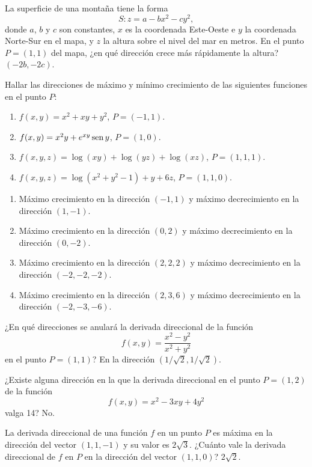 {La superficie de una montaña tiene la forma
\[
S:z=a-bx^2-cy^2,
\]
donde $a$, $b$ y $c$ son constantes, $x$ es la coordenada Este-Oeste e $y$ la coordenada Norte-Sur en el mapa, y $z$ la altura sobre el nivel del mar en metros. 
En el punto $P=(1,1)$ del mapa, ¿en qué dirección crece más rápidamente la altura?
}
{$(-2b,-2c)$.
}
{
}


{Hallar las direcciones de máximo y mínimo crecimiento de las siguientes funciones en el punto $P$:
\begin{enumerate}
\item $f(x,y)=x^2+xy+y^2$, $P=(-1,1)$.
\item $f(x,y)=x^2y+e^{xy}\operatorname{sen} y$, $P=(1,0)$.
\item $f(x,y,z)=\log(xy)+\log(yz)+\log(xz)$, $P=(1,1,1)$.
\item $f(x,y,z)=\log(x^2+y^2-1)+y+6z$, $P=(1,1,0)$.
\end{enumerate}
}
{\begin{enumerate}
\item Máximo crecimiento en la dirección $(-1,1)$ y máximo decrecimiento en la dirección $(1,-1)$.
\item Máximo crecimiento en la dirección $(0,2)$ y máximo decrecimiento en la dirección $(0,-2)$.
\item Máximo crecimiento en la dirección $(2,2,2)$ y máximo decrecimiento en la dirección $(-2,-2,-2)$.
\item Máximo crecimiento en la dirección $(2,3,6)$ y máximo decrecimiento en la dirección $(-2,-3,-6)$.
\end{enumerate}
}
{
}


{¿En qué direcciones se anulará la derivada direccional de la función
\[
f(x,y)=\frac{x^2-y^2}{x^2+y^2}
\]
en el punto $P=(1,1)$?
}
{En la dirección $(1/\sqrt{2},1/\sqrt{2})$.
}
{
}


{¿Existe alguna dirección en la que la derivada direccional en el punto $P=(1,2)$ de la función 
\[
f(x,y) = x^2-3xy+4y^2
\]
valga 14?
}
{No.
}
{
}


{La derivada direccional de una función $f$ en un punto $P$ es máxima en la dirección del vector $(1,1,-1)$ y su valor es $2\sqrt{3}$.
¿Cuánto vale la derivada direccional de $f$ en $P$ en la dirección del vector $(1,1,0)$?
}
{$2\sqrt{2}$.
}
{
}


